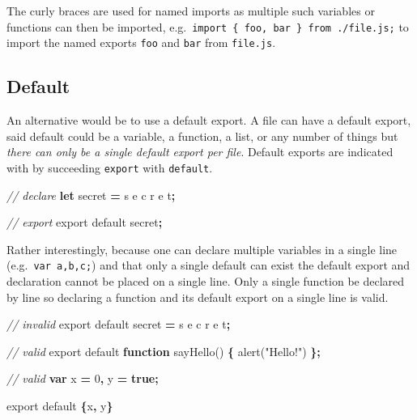\documentclass[
  10pt,
]{krantz}
\makeatletter
\newenvironment{Shaded}{\begin{snugshade}}{\end{snugshade}}
\newcommand{\AttributeTok}[1]{\textcolor[rgb]{0.61,0.61,0.61}{#1}}
\newcommand{\CommentTok}[1]{\textcolor[rgb]{0.37,0.37,0.37}{\textit{#1}}}
\newcommand{\DecValTok}[1]{\textcolor[rgb]{0.06,0.06,0.06}{#1}}
\newcommand{\ImportTok}[1]{#1}
\newcommand{\KeywordTok}[1]{\textcolor[rgb]{0.27,0.27,0.27}{\textbf{#1}}}
\newcommand{\NormalTok}[1]{#1}
\newcommand{\OperatorTok}[1]{\textcolor[rgb]{0.43,0.43,0.43}{\textbf{#1}}}
\newcommand{\StringTok}[1]{\textcolor[rgb]{0.5,0.5,0.5}{#1}}
\newenvironment{kframe}{%
\medskip{}
\setlength{\fboxsep}{.8em}
 \def\at@end@of@kframe{}%
 \ifinner\ifhmode%
  \def\at@end@of@kframe{\end{minipage}}%
  \begin{minipage}{\columnwidth}%
 \fi\fi%
 \def\FrameCommand##1{\hskip\@totalleftmargin \hskip-\fboxsep
 \colorbox{shadecolor}{##1}\hskip-\fboxsep
     \hskip-\linewidth \hskip-\@totalleftmargin \hskip\columnwidth}%
 \MakeFramed {\advance\hsize-\width
   \@totalleftmargin\z@ \linewidth\hsize
   \@setminipage}}%
 {\par\unskip\endMakeFramed%
 \at@end@of@kframe}
\renewenvironment{Shaded}{\begin{kframe}}{\end{kframe}}
\makeatother
\begin{document}
The curly braces are used for named imports as multiple such variables or functions can then be imported, e.g.~\texttt{import\ \{\ foo,\ bar\ \}\ from\ \textquotesingle{}./file.js\textquotesingle{};} to import the named exports \texttt{foo} and \texttt{bar} from \texttt{file.js}.

\hypertarget{webpack-intro-import-export-default}{%
\subsection{Default}\label{webpack-intro-import-export-default}}

An alternative would be to use a default export. A file can have a default export, said default could be a variable, a function, a list, or any number of things but \emph{there can only be a single default export per file}. Default exports are indicated with by succeeding \texttt{export} with \texttt{default}.

\begin{Shaded}
\begin{Highlighting}[]
\CommentTok{// declare}
\KeywordTok{let}\NormalTok{ secret }\OperatorTok{=} \StringTok{\textquotesingle{}s e c r e t\textquotesingle{}}\OperatorTok{;}

\CommentTok{// export}
\ImportTok{export} \ImportTok{default}\NormalTok{ secret}\OperatorTok{;}
\end{Highlighting}
\end{Shaded}

Rather interestingly, because one can declare multiple variables in a single line (e.g.~\texttt{var\ a,b,c;}) and that only a single default can exist the default export and declaration cannot be placed on a single line. Only a single function be declared by line so declaring a function and its default export on a single line is valid.

\begin{Shaded}
\begin{Highlighting}[]
\CommentTok{// invalid}
\ImportTok{export} \ImportTok{default}\NormalTok{ secret }\OperatorTok{=} \StringTok{\textquotesingle{}s e c r e t\textquotesingle{}}\OperatorTok{;}

\CommentTok{// valid}
\ImportTok{export} \ImportTok{default} \KeywordTok{function} \AttributeTok{sayHello}\NormalTok{() }\OperatorTok{\{}
  \AttributeTok{alert}\NormalTok{(}\StringTok{"Hello!"}\NormalTok{)}
\OperatorTok{\};}

\CommentTok{// valid}
\KeywordTok{var}\NormalTok{ x }\OperatorTok{=} \DecValTok{0}\OperatorTok{,}
\NormalTok{    y }\OperatorTok{=} \KeywordTok{true}\OperatorTok{;}

\ImportTok{export} \ImportTok{default} \OperatorTok{\{}\NormalTok{x}\OperatorTok{,}\NormalTok{ y}\OperatorTok{\}}
\end{Highlighting}
\end{Shaded}
\end{document}
